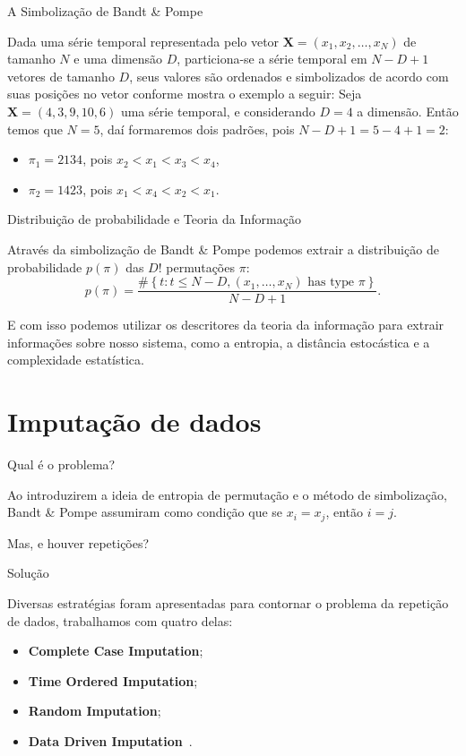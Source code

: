 \documentclass{beamer}
\begin{document}
\begin{frame}{A Simbolização de Bandt \& Pompe}

Dada uma série temporal representada pelo vetor $\bm {X} = (x_1, x_2, \dots, x_N)$ de tamanho $N$ e uma dimensão $D$, particiona-se a série temporal em $N - D + 1$ vetores de tamanho $D$, seus valores são ordenados e simbolizados de acordo com suas posições no vetor conforme mostra o exemplo a seguir:
Seja $\bm {X} = (4,3,9,10,6)$ uma série temporal, e considerando $D = 4$ a dimensão. Então temos que $N = 5$, daí formaremos dois padrões, pois $N - D + 1 = 5 - 4 + 1 = 2$:
\begin{itemize}
    \item$\pi_1 = 2134$, pois $x_2 < x_1 < x_3 < x_4$,
    \item$\pi_2 = 1423$, pois $x_1 < x_4 < x_2 < x_1$.
\end{itemize}
 
\end{frame}

\begin{frame}{Distribuição de probabilidade e Teoria da Informação}

Através da simbolização de Bandt \& Pompe podemos extrair a distribuição de probabilidade 
$p(\pi)$ das $D!$ permutações $\pi$:
$$
p(\pi) = \frac{\# \left\{t\colon t \leq N - D, (x_1,\dots,x_N)  \text{ has type } \pi\right\}}{N - D + 1}.
$$


E com isso podemos utilizar os descritores da teoria da informação para extrair informações sobre nosso sistema, como a entropia, a distância estocástica e a complexidade estatística.

\end{frame}

\section{Imputação de dados}

\begin{frame}{Qual é o problema?}

Ao introduzirem a ideia de entropia de permutação e o método de simbolização, Bandt \& Pompe assumiram como condição que se $x_i = x_j$, então $i = j$. 

Mas, e houver repetições?

\end{frame}

\begin{frame}{Solução}

Diversas estratégias foram apresentadas para contornar o problema da repetição de dados, trabalhamos com quatro delas:

\begin{itemize}
    \item \textbf{Complete Case Imputation};
    \item \textbf{Time Ordered Imputation};
    \item \textbf{Random Imputation};
    \item \textbf{Data Driven Imputation}~\cite{traversaro2018bandt}.
\end{itemize}

\end{frame}
\end{document}
